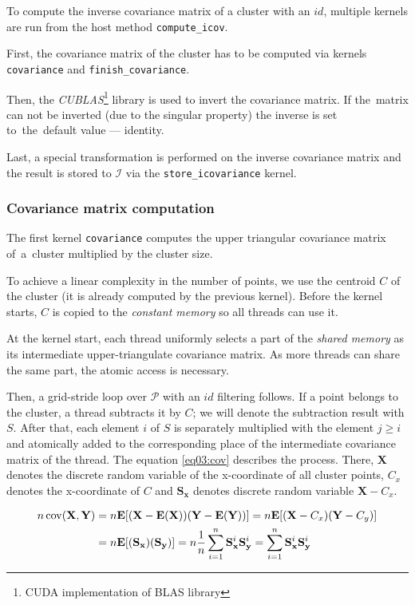 To compute the inverse covariance matrix of a cluster with an $id$, multiple kernels are run from the host method \texttt{compute\_icov}. 

First, the covariance matrix of the cluster has to be computed via kernels \texttt{covariance} and \texttt{finish\_covariance}. 

Then, the \emph{CUBLAS}\footnote{CUDA implementation of BLAS library} library is used to invert the covariance matrix. If the~matrix can not be inverted (due to the singular property) the inverse is set to~the~default value --- identity. 

Last, a special transformation is performed on the inverse covariance matrix and the result is stored to $\mathcal{I}$ via the \texttt{store\_icovariance} kernel.

\subsubsection{Covariance matrix computation}

The first kernel \texttt{covariance} computes the upper triangular covariance matrix of~a~cluster multiplied by the cluster size. 

To achieve a linear complexity in the number of points, we use the centroid $C$ of the cluster (it is already computed by the previous kernel). Before the kernel starts, $C$ is copied to the \emph{constant memory} so all threads can use it.

At the kernel start, each thread uniformly selects a part of the \emph{shared memory} as its intermediate upper-triangulate covariance matrix. As more threads can share the same part, the atomic access is necessary.

Then, a grid-stride loop over $\mathcal{P}$ with an $id$ filtering follows. If a point belongs to the cluster, a thread subtracts it by $C$; we will denote the subtraction result with $S$. After that, each element $i$ of $S$ is separately multiplied with the element $j \ge i$ and atomically added to the corresponding place of the intermediate covariance matrix of the thread. The equation \ref{eq03:cov} describes the process. There, $\textbf{X}$ denotes the discrete random variable of the x-coordinate of all cluster points, $C_x$ denotes the x-coordinate of $C$ and $\mathbf{S_x}$ denotes discrete random variable $\mathbf{X}-C_x$.

\begin{equation}
\begin{split}
n\operatorname{cov}(\mathbf{X},\mathbf{Y}) &= n\mathbf{E}[(\mathbf{X}-\mathbf{E}(\mathbf{X}))(\mathbf{Y}-\mathbf{E}(\mathbf{Y}))] = n\mathbf{E}[(\mathbf{X}-C_x)(\mathbf{Y}-C_y)] \\ &= n\mathbf{E}[(\mathbf{S_x})(\mathbf{S_y})] = n\frac{1}{n}\sum_{i=1}^{n}{\mathbf{S}_{\mathbf{x}}^{i}\mathbf{S}_{\mathbf{y}}^{i}} = \sum_{i=1}^{n}{\mathbf{S}_{\mathbf{x}}^{i}\mathbf{S}_{\mathbf{y}}^{i}}
\end{split}
\label{eq03:cov}
\end{equation}

